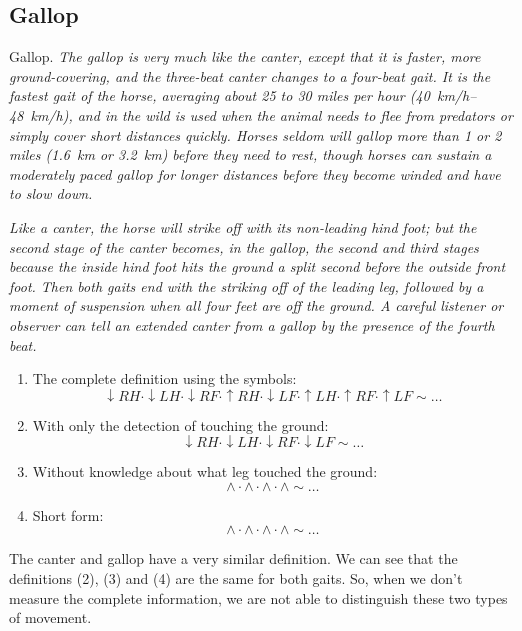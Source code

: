 \subsection{Gallop}
\begin{definition}{Gallop.}
    \label{def:gallop}
    \textit{The gallop is very much like the canter, except that it is faster, more ground-covering, and the three-beat canter changes to a four-beat gait. It is the fastest gait of the horse, averaging about 25 to 30 miles per hour (\SIrange{40}{48}{km/h}), and in the wild is used when the animal needs to flee from predators or simply cover short distances quickly. Horses seldom will gallop more than 1 or 2 miles (\SI{1.6}{km} or \SI{3.2}{km}) before they need to rest, though horses can sustain a moderately paced gallop for longer distances before they become winded and have to slow down.}
    
    \textit{Like a canter, the horse will strike off with its non-leading hind foot; but the second stage of the canter becomes, in the gallop, the second and third stages because the inside hind foot hits the ground a split second before the outside front foot. Then both gaits end with the striking off of the leading leg, followed by a moment of suspension when all four feet are off the ground. A careful listener or observer can tell an extended canter from a gallop by the presence of the fourth beat.} \cite{Harrisc1993}
    
    \begin{enumerate}
        \item The complete definition using the symbols:
        $$ \downarrow RH \cdot \downarrow LH \cdot \downarrow RF \cdot \uparrow RH \cdot \downarrow LF \cdot \uparrow LH \cdot \uparrow RF \cdot \uparrow LF \sim \dots $$
        \item With only the detection of touching the ground:
        $$ \downarrow RH \cdot \downarrow LH \cdot \downarrow RF \cdot \downarrow LF \sim \dots $$
        \item Without knowledge about what leg touched the ground:
        $$ \wedge \cdot \wedge \cdot \wedge \cdot \wedge \sim \dots $$
        \item Short form:
        $$ \wedge \cdot \wedge \cdot \wedge \cdot \wedge \sim \dots $$
    \end{enumerate}
\end{definition}

\begin{remark}
    The canter and gallop have a very similar definition. We can see that the definitions (2), (3) and (4) are the same for both gaits. So, when we don't measure the complete information, we are not able to distinguish these two types of movement.
\end{remark}

